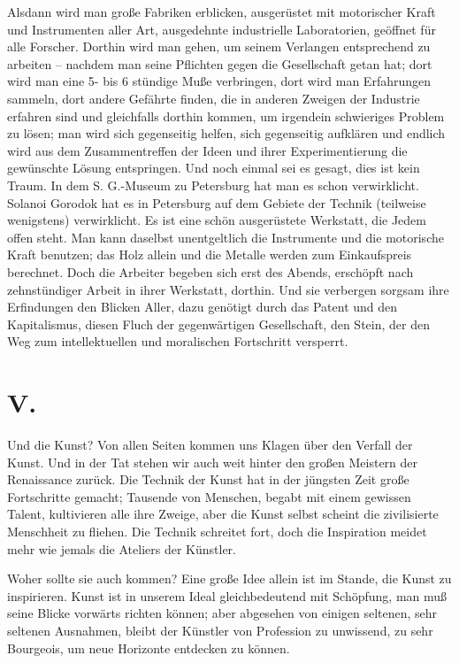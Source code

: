 \documentclass{scrbook}
\begin{document}
Alsdann wird man große Fabriken erblicken, ausgerüstet mit motorischer Kraft und Instrumenten aller Art, ausgedehnte industrielle Laboratorien, geöffnet für alle Forscher. Dorthin wird man gehen, um seinem Verlangen entsprechend zu arbeiten – nachdem man seine Pflichten gegen die Gesellschaft getan hat; dort wird man eine 5- bis 6 stündige Muße verbringen, dort wird man Erfahrungen sammeln, dort andere Gefährte finden, die in anderen Zweigen der Industrie erfahren sind und gleichfalls dorthin kommen, um irgendein schwieriges Problem zu lösen; man wird sich gegenseitig helfen, sich gegenseitig aufklären und endlich wird aus dem Zusammentreffen der Ideen und ihrer Experimentierung die gewünschte Lösung entspringen. Und noch einmal sei es gesagt, dies ist kein Traum. In dem S. G.-Museum zu Petersburg hat man es schon verwirklicht. Solanoi Gorodok hat es in Petersburg auf dem Gebiete der Technik (teilweise wenigstens) verwirklicht. Es ist eine schön ausgerüstete Werkstatt, die Jedem offen steht. Man kann daselbst unentgeltlich die Instrumente und die motorische Kraft benutzen; das Holz allein und die Metalle werden zum Einkaufspreis berechnet. Doch die Arbeiter begeben sich erst des Abends, erschöpft nach zehnstündiger Arbeit in ihrer Werkstatt, dorthin. Und sie verbergen sorgsam ihre Erfindungen den Blicken Aller, dazu genötigt durch das Patent und den Kapitalismus, diesen Fluch der gegenwärtigen Gesellschaft, den Stein, der den Weg zum intellektuellen und moralischen Fortschritt versperrt.

\section*{V.}

Und die Kunst? Von allen Seiten kommen uns Klagen über den Verfall der Kunst. Und in der Tat stehen wir auch weit hinter den großen Meistern der Renaissance zurück. Die Technik der Kunst hat in der jüngsten Zeit große Fortschritte gemacht; Tausende von Menschen, begabt mit einem gewissen Talent, kultivieren alle ihre Zweige, aber die Kunst selbst scheint die zivilisierte Menschheit zu fliehen. Die Technik schreitet fort, doch die Inspiration meidet mehr wie jemals die Ateliers der Künstler.

Woher sollte sie auch kommen? Eine große Idee allein ist im Stande, die Kunst zu inspirieren. Kunst ist in unserem Ideal gleichbedeutend mit Schöpfung, man muß seine Blicke vorwärts richten können; aber abgesehen von einigen seltenen, sehr seltenen Ausnahmen, bleibt der Künstler von Profession zu unwissend, zu sehr Bourgeois, um neue Horizonte entdecken zu können.
\end{document}
